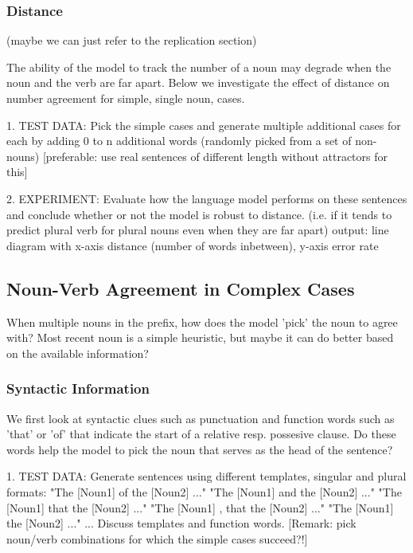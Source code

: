 \begin{multicols}{2}
\subsubsection{Distance}

(maybe we can just refer to the replication section)

The ability of the model to track the number of a noun may degrade
when the noun and the verb are far apart.
Below we investigate the effect of distance on number agreement for simple,
single noun, cases.

1. TEST DATA:
Pick the simple cases and generate multiple additional cases for each by adding 0 to n additional words (randomly picked from a set of non-nouns)
[preferable: use real sentences of different length without attractors for this]

2. EXPERIMENT:
Evaluate how the language model performs on these sentences 
and conclude whether or not the model is robust to distance. 
(i.e. if it tends to predict plural verb for plural nouns even when they are far apart)
output: line diagram with x-axis distance (number of words inbetween), y-axis error rate
 
\subsection{Noun-Verb Agreement in Complex Cases}

When multiple nouns in the prefix, how does the model 'pick' the noun to agree with?
Most recent noun is a simple heuristic, but maybe it can do better based
on the available information?

\subsubsection{Syntactic Information}

We first look at syntactic clues such as punctuation
and function words such as 'that' or 'of'
that indicate the start of a relative resp. possesive
clause. Do these words help the model to pick
the noun that serves as the head of the sentence?

1. TEST DATA:
Generate sentences using different templates, singular and plural formats:
"The [Noun1] of the [Noun2] ..."
"The [Noun1] and the [Noun2] ..."
"The [Noun1] that the [Noun2] ..."
"The [Noun1] , that the [Noun2] ..."
"The [Noun1] the [Noun2] ..."
...
Discuss templates and function words.
[Remark: pick noun/verb combinations for which the simple cases succeed?!]


\end{multicols}

